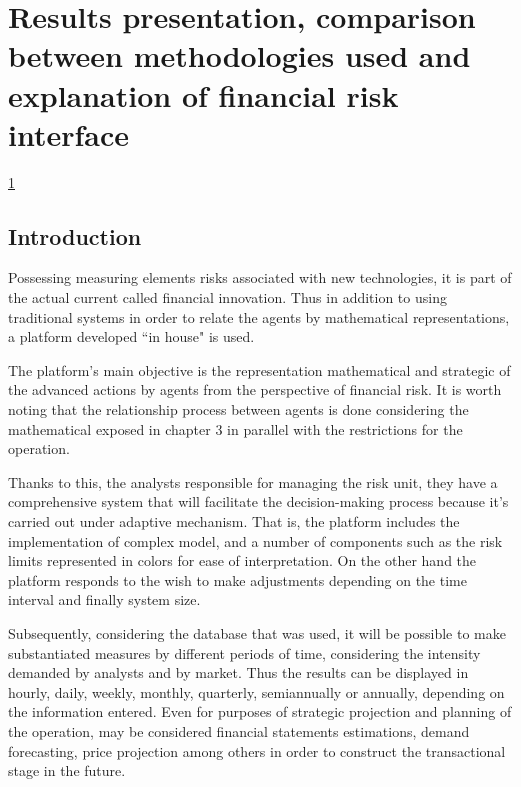 \documentclass[12pt]{book}
\begin{document}
\chapter[Results]{Results presentation, comparison between methodologies used and explanation of financial risk interface }
\label{Chapter4} %
\ref{Chapter4}


\section{Introduction}

Possessing measuring elements risks associated with new technologies, it is part of the actual current called financial innovation. Thus in addition to using traditional systems in order to relate the agents by mathematical representations, a platform developed ``in house" is used.

The platform's main objective is the representation mathematical and strategic of the advanced actions by agents from the perspective of financial risk. It is worth noting that the relationship process between agents is done considering the mathematical exposed in chapter 3 in parallel with the restrictions for the operation.

Thanks to this, the analysts responsible for managing the risk unit, they have a comprehensive system that will facilitate the decision-making process because it's carried out under adaptive mechanism. That is, the platform includes the implementation of complex model, and a number of components such as the risk limits represented in colors for ease of interpretation. On the other hand the platform responds to the wish to make adjustments depending on the time interval and finally system size.

Subsequently, considering the database that was used, it will be possible to make substantiated measures by different periods of time, considering the intensity demanded by analysts and by market. Thus the results can be displayed in hourly, daily, weekly, monthly, quarterly, semiannually or annually, depending on the information entered. Even for purposes of strategic projection and planning of the operation, may be considered financial statements estimations, demand forecasting, price projection among others in order to construct the transactional stage in the future.
\end{document}

